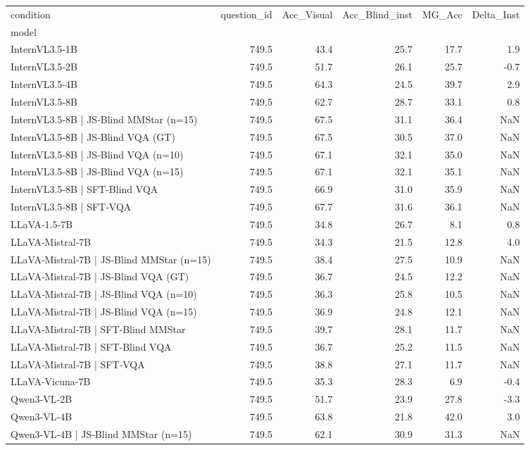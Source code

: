 \begin{tabular}{lrrrrr}
\toprule
condition & question_id & Acc_Visual & Acc_Blind_inst & MG_Acc & Delta_Inst \\
model &  &  &  &  &  \\
\midrule
InternVL3.5‑1B & 749.5 & 43.4 & 25.7 & 17.7 & 1.9 \\
InternVL3.5‑2B & 749.5 & 51.7 & 26.1 & 25.7 & -0.7 \\
InternVL3.5‑4B & 749.5 & 64.3 & 24.5 & 39.7 & 2.9 \\
InternVL3.5‑8B & 749.5 & 62.7 & 28.7 & 33.1 & 0.8 \\
InternVL3.5‑8B | JS‑Blind MMStar (n=15) & 749.5 & 67.5 & 31.1 & 36.4 & NaN \\
InternVL3.5‑8B | JS‑Blind VQA (GT) & 749.5 & 67.5 & 30.5 & 37.0 & NaN \\
InternVL3.5‑8B | JS‑Blind VQA (n=10) & 749.5 & 67.1 & 32.1 & 35.0 & NaN \\
InternVL3.5‑8B | JS‑Blind VQA (n=15) & 749.5 & 67.1 & 32.1 & 35.1 & NaN \\
InternVL3.5‑8B | SFT‑Blind VQA & 749.5 & 66.9 & 31.0 & 35.9 & NaN \\
InternVL3.5‑8B | SFT‑VQA & 749.5 & 67.7 & 31.6 & 36.1 & NaN \\
LLaVA‑1.5‑7B & 749.5 & 34.8 & 26.7 & 8.1 & 0.8 \\
LLaVA‑Mistral‑7B & 749.5 & 34.3 & 21.5 & 12.8 & 4.0 \\
LLaVA‑Mistral‑7B | JS‑Blind MMStar (n=15) & 749.5 & 38.4 & 27.5 & 10.9 & NaN \\
LLaVA‑Mistral‑7B | JS‑Blind VQA (GT) & 749.5 & 36.7 & 24.5 & 12.2 & NaN \\
LLaVA‑Mistral‑7B | JS‑Blind VQA (n=10) & 749.5 & 36.3 & 25.8 & 10.5 & NaN \\
LLaVA‑Mistral‑7B | JS‑Blind VQA (n=15) & 749.5 & 36.9 & 24.8 & 12.1 & NaN \\
LLaVA‑Mistral‑7B | SFT‑Blind MMStar & 749.5 & 39.7 & 28.1 & 11.7 & NaN \\
LLaVA‑Mistral‑7B | SFT‑Blind VQA & 749.5 & 36.7 & 25.2 & 11.5 & NaN \\
LLaVA‑Mistral‑7B | SFT‑VQA & 749.5 & 38.8 & 27.1 & 11.7 & NaN \\
LLaVA‑Vicuna‑7B & 749.5 & 35.3 & 28.3 & 6.9 & -0.4 \\
Qwen3‑VL‑2B & 749.5 & 51.7 & 23.9 & 27.8 & -3.3 \\
Qwen3‑VL‑4B & 749.5 & 63.8 & 21.8 & 42.0 & 3.0 \\
Qwen3‑VL‑4B | JS‑Blind MMStar (n=15) & 749.5 & 62.1 & 30.9 & 31.3 & NaN \\

\end{tabular}
